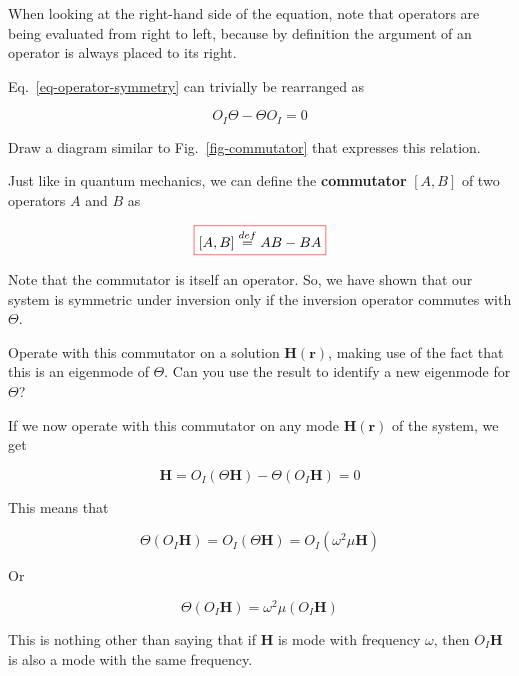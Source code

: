 When looking at the right-hand side of the equation, note that operators are being evaluated from right to left, because by definition the argument of an operator is always placed to its right.

Eq.~\ref{eq-operator-symmetry} can trivially be rearranged as

$$O_I \Theta - \Theta O_I = 0$$

\begin{exer}
Draw a diagram similar to Fig.~\ref{fig-commutator} that expresses this relation.
\end{exer}

Just like in quantum mechanics, we can define the \textbf{commutator} $[A,B]$ of two operators $A$ and $B$ as

\begin{equation}
 \fbox{$\displaystyle
   [A,B] \stackrel{def}{=} AB - BA
 $}
\end{equation} 

Note that the commutator is itself an operator. So, we have shown that our system is symmetric under inversion only if the inversion operator commutes with $\Theta$.

\pagebreak

\begin{cue}
Operate with this commutator on a solution ${\mathbf H({\mathbf r})}$, making use of the fact that this is an eigenmode of $\Theta$. Can you use the result to identify a new eigenmode for $\Theta$? 
\end{cue}

If we now operate with this commutator on any mode ${\mathbf H({\mathbf r})}$ of the system, we get

\begin{equation}
[O_I, \Theta] {\mathbf H}= O_I(\Theta {\mathbf H}) - \Theta (O_I {\mathbf H} ) = 0
\end{equation} 

This means that

\begin{equation}
\Theta (O_I {\mathbf H} ) = O_I(\Theta {\mathbf H}) = O_I ( \omega^2 \mu {\mathbf H})
\end{equation} 

Or

\begin{equation}
\Theta (O_I {\mathbf H} ) =  \omega^2 \mu (O_I {\mathbf H})
\end{equation} 

This is nothing other than saying that if ${\mathbf H}$ is mode with frequency $\omega$, then $O_I {\mathbf H}$ is also a mode with the same frequency.


